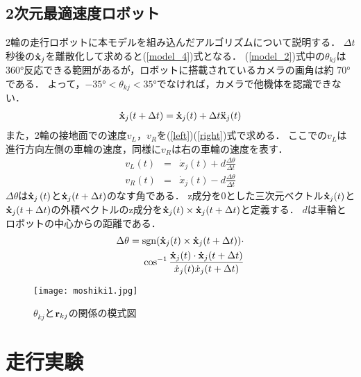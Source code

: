 \documentclass[twocolumn]{jarticle} %
\begin{document}
\subsection{2次元最適速度ロボット}
\vspace{1mm}
2輪の走行ロボットに本モデルを組み込んだアルゴリズムについて説明する．
$\Delta t$秒後の${\bf \dot{x}}_j$を離散化して求めると(\ref{model_4})式となる．
(\ref{model_2})式中の$\theta_{kj}$は 360°反応できる範囲があるが，ロボットに搭載されているカメラの画角は約 70°である．
よって，$ -35°< \theta_{kj} < 35°$でなければ，カメラで他機体を認識できない．
\begin{eqnarray}
{\bf \dot{x}}_j(t+\Delta t) = {\bf \dot{x}}_j(t) + \Delta t {\bf \ddot{x}}_j (t)
\label{model_4}
\end{eqnarray}
また，2輪の接地面での速度$v_L$，$v_R$を(\ref{left})(\ref{right})式で求める．
ここでの$v_L$は進行方向左側の車輪の速度，同様に$v_R$は右の車輪の速度を表す．
\begin{eqnarray}
\label{left}
v_L(t) &=& \dot{x}_j(t) + d \frac{\Delta\theta}{\Delta t}\\
\label{right}
v_R(t) &=& \dot{x}_j(t) - d \frac{\Delta\theta}{\Delta t}
\end{eqnarray}
$\Delta\theta$は${\bf \dot{x}}_j \left(t\right)$と${\bf \dot{x}}_j (t+\Delta t)$のなす角である．
z成分を0とした三次元ベクトル${\bf \dot{x}}_j(t)$と${\bf \dot{x}}_j (t+\Delta t)$の外積ベクトルのz成分を${\bf \dot{x}}_j (t)\times{\bf \dot{x}}_j (t + \Delta t) $と定義する． 
$d$は車輪とロボットの中心からの距離である．
\begin{eqnarray}
\Delta\theta =
\mbox{sgn}({\bf \dot{x}}_j (t) \times {\bf \dot{x}}_j (t+\Delta t)) \cdot \nonumber \\
\quad \cos^{-1} \frac{{\bf \dot{x}}_j (t) \cdot {\bf \dot{x}}_j (t+\Delta t)}{{\dot{x}}_j (t){\dot{x}}_j (t+\Delta t)} 
\end{eqnarray}
\begin{figure}[t]
  \texttt{[image: moshiki1.jpg]}
  \caption{$\theta _{kj}$と${\bf {r}}_{kj}$の関係の模式図}
  \label{moshikizu}
\end{figure}
\section{走行実験}
\end{document}
